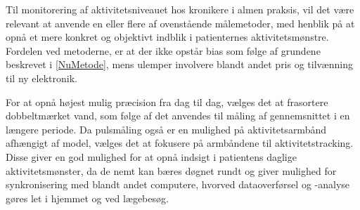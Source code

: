 Til monitorering af aktivitetsniveauet hos kronikere i almen praksis, vil det være relevant at anvende en eller flere af ovenstående målemetoder, med henblik på at opnå et mere konkret og objektivt indblik i patienternes aktivitetsmønstre. Fordelen ved metoderne, er at der ikke opstår bias som følge af grundene beskrevet i \autoref{NuMetode}, mens ulemper involvere blandt andet pris og tilvænning til ny elektronik. 

For at opnå højest mulig præcision fra dag til dag, vælges det at frasortere dobbeltmærket vand, som følge af det anvendes til måling af gennemsnittet i en længere periode. Da pulsmåling også er en mulighed på aktivitetsarmbånd afhængigt af model, vælges det at fokusere på armbåndene til aktivitetstracking. Disse giver en god mulighed for at opnå indsigt i patientens daglige aktivitetsmønster, da de nemt kan bæres døgnet rundt og giver mulighed for synkronisering med blandt andet computere, hvorved dataoverførsel og -analyse gøres let i hjemmet og ved lægebesøg.











